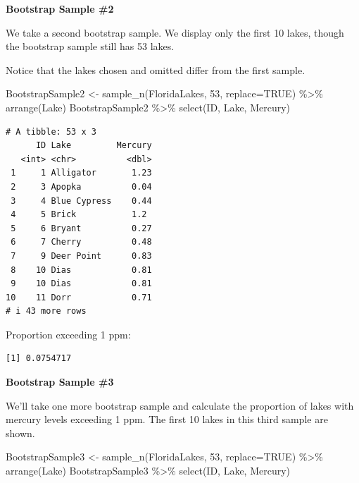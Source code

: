 \documentclass[
  letterpaper,
  DIV=11,
  numbers=noendperiod]{scrreprt}
\newenvironment{Shaded}{\begin{snugshade}}{\end{snugshade}}
\newcommand{\AttributeTok}[1]{\textcolor[rgb]{0.40,0.45,0.13}{#1}}
\newcommand{\ConstantTok}[1]{\textcolor[rgb]{0.56,0.35,0.01}{#1}}
\newcommand{\DecValTok}[1]{\textcolor[rgb]{0.68,0.00,0.00}{#1}}
\newcommand{\FunctionTok}[1]{\textcolor[rgb]{0.28,0.35,0.67}{#1}}
\newcommand{\NormalTok}[1]{\textcolor[rgb]{0.00,0.23,0.31}{#1}}
\newcommand{\OtherTok}[1]{\textcolor[rgb]{0.00,0.23,0.31}{#1}}
\newcommand{\SpecialCharTok}[1]{\textcolor[rgb]{0.37,0.37,0.37}{#1}}
\begin{document}
\textbf{Bootstrap Sample \#2}

We take a second bootstrap sample. We display only the first 10 lakes,
though the bootstrap sample still has 53 lakes.

Notice that the lakes chosen and omitted differ from the first sample.

\begin{Shaded}
\begin{Highlighting}[]
\NormalTok{BootstrapSample2 }\OtherTok{\textless{}{-}} \FunctionTok{sample\_n}\NormalTok{(FloridaLakes, }\DecValTok{53}\NormalTok{, }\AttributeTok{replace=}\ConstantTok{TRUE}\NormalTok{) }\SpecialCharTok{\%\textgreater{}\%} \FunctionTok{arrange}\NormalTok{(Lake)}
\NormalTok{BootstrapSample2 }\SpecialCharTok{\%\textgreater{}\%} \FunctionTok{select}\NormalTok{(ID, Lake, Mercury)}
\end{Highlighting}
\end{Shaded}

\begin{verbatim}
# A tibble: 53 x 3
      ID Lake         Mercury
   <int> <chr>          <dbl>
 1     1 Alligator       1.23
 2     3 Apopka          0.04
 3     4 Blue Cypress    0.44
 4     5 Brick           1.2 
 5     6 Bryant          0.27
 6     7 Cherry          0.48
 7     9 Deer Point      0.83
 8    10 Dias            0.81
 9    10 Dias            0.81
10    11 Dorr            0.71
# i 43 more rows
\end{verbatim}

Proportion exceeding 1 ppm:

\begin{Shaded}
\end{Shaded}

\begin{verbatim}
[1] 0.0754717
\end{verbatim}

\textbf{Bootstrap Sample \#3}

We'll take one more bootstrap sample and calculate the proportion of
lakes with mercury levels exceeding 1 ppm. The first 10 lakes in this
third sample are shown.

\begin{Shaded}
\begin{Highlighting}[]
\NormalTok{BootstrapSample3 }\OtherTok{\textless{}{-}} \FunctionTok{sample\_n}\NormalTok{(FloridaLakes, }\DecValTok{53}\NormalTok{, }\AttributeTok{replace=}\ConstantTok{TRUE}\NormalTok{) }\SpecialCharTok{\%\textgreater{}\%} \FunctionTok{arrange}\NormalTok{(Lake)}
\NormalTok{BootstrapSample3 }\SpecialCharTok{\%\textgreater{}\%} \FunctionTok{select}\NormalTok{(ID, Lake, Mercury)}
\end{Highlighting}
\end{Shaded}
\end{document}
